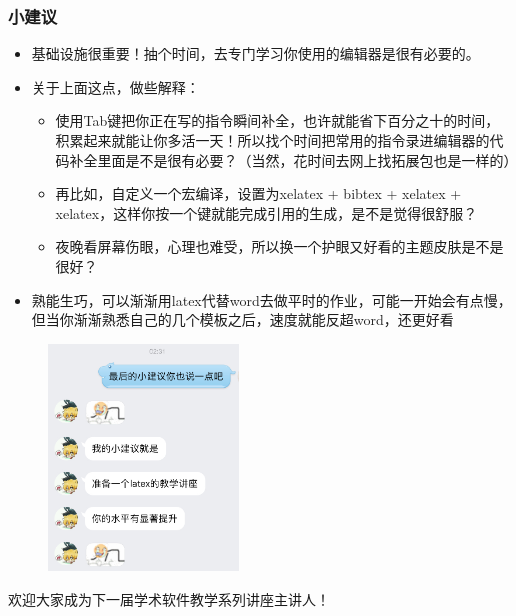     \begin{frame}[fragile]
        \frametitle{小建议}
        \begin{itemize}
            \item 基础设施很重要！抽个时间，去专门学习你使用的编辑器是很有必要的。
            \item 关于上面这点，做些解释：
            \begin{itemize}
                \item 使用Tab键把你正在写的指令瞬间补全，也许就能省下百分之十的时间，积累起来就能让你多活一天！所以找个时间把常用的指令录进编辑器的代码补全里面是不是很有必要？（当然，花时间去网上找拓展包也是一样的）
                \item 再比如，自定义一个宏编译，设置为xelatex + bibtex + xelatex + xelatex，这样你按一个键就能完成引用的生成，是不是觉得很舒服？
                \item 夜晚看屏幕伤眼，心理也难受，所以换一个护眼又好看的主题皮肤是不是很好？
            \end{itemize}\pause
            \item 熟能生巧，可以渐渐用latex代替word去做平时的作业，可能一开始会有点慢，但当你渐渐熟悉自己的几个模板之后，速度就能反超word，还更好看
        \end{itemize}
    \end{frame}
    
    \begin{frame}[fragile]
        \begin{figure}
        \includegraphics[width=0.45\textwidth]{img//tip.png}
        \end{figure}
        \begin{center}
        欢迎大家成为下一届学术软件教学系列讲座主讲人！
        \end{center}
    \end{frame}
    
